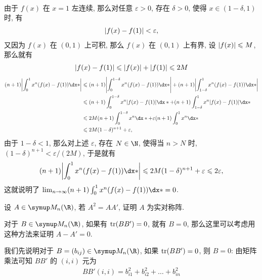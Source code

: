 \begin{exercise}[series=exer]
\begin{answer}
\begin{align*}
      \end{align*}
      由于 $ f(x) $ 在 $ x = 1 $ 左连续, 那么对任意 $ \varepsilon > 0 $, 存在 $ \delta > 0 $, 使得 $ x \in (1 - \delta, 1) $ 时, 有
      \begin{align*}
          \abs{f(x) - f(1)} < \varepsilon,
      \end{align*}
      又因为 $ f(x) $ 在 $ (0, 1) $ 上可积, 那么 $ f(x) $ 在 $ (0, 1) $ 上有界, 设 $ \abs{f(x)} \leqslant M $, 那么就有
      \begin{align*}
          \abs{f(x) - f(1)} \leqslant \abs{f(x)} + \abs{f(1)} \leqslant 2M
      \end{align*}
      \begin{align*}
          (n + 1) \abs{\int_{0}^{1} x^{n} (f(x) - f(1)) \dx*} & \le (n + 1) \abs{\int_{0}^{1 - \delta} x^{n} (f(x) - f(1)) \dx*} + (n + 1) \abs{\int_{1 - \delta}^{1} x^{n} (f(x) - f(1)) \dx*}\\
          & \le (n + 1) \int_{0}^{1 - \delta} x^{n} \abs{f(x) - f(1)} \dx* + (n + 1) \int_{1 - \delta}^{1} x^{n} \abs{f(x) - f(1)} \dx*\\
          & \le 2M(n + 1)\int_{0}^{1 - \delta} x^{n} \dx* + \varepsilon (n + 1) \int_{0}^{1} x^{n} \dx*\\
          & \le 2M(1 - \delta)^{n + 1} + \varepsilon,
      \end{align*}
      由于 $ 1 - \delta < 1 $, 那么对上述 $ \varepsilon $, 存在 $ N \in \N $, 使得当 $ n > N $ 时, $ (1 - \delta)^{n + 1} < \varepsilon/(2M) $, 于是就有
      \begin{align*}
          (n + 1) \abs{\int_{0}^{1} x^{n} (f(x) - f(1)) \dx*} \le 2M(1 - \delta)^{n + 1} + \varepsilon \le 2\varepsilon,
      \end{align*}
      这就说明了 $ \limit{n}{\infty} (n + 1) \int_{0}^{1} x^{n} (f(x) - f(1)) \dx* = 0 $.
  \end{answer}
  \item\label{item:A2=AA'} 设 $ A \in \MM $, 若 $ A^{2} = AA' $, 证明 $ A $ 为实对称阵.
  \begin{hint}
      对于 $ B \in \MM $, 如果有 $ \tr(BB') = 0 $, 就有 $ B = 0 $, 那么这里可以考虑用这种方法来证明 $ A - A' = 0 $.
  \end{hint}
  \begin{answer}
      我们先说明对于 $ B = (b_{ij}) \in \MM $, 如果 $ \tr(BB') = 0 $, 则 $ B = 0 $: 由矩阵乘法可知 $ BB' $ 的 $ (i, i) $ 元为
      \begin{align*}
          BB'(i, i) = b_{i1}^{2} + b_{i2}^{2} + \dots + b_{in}^{2}
      \end{align*}

\end{answer}
\end{exercise}
